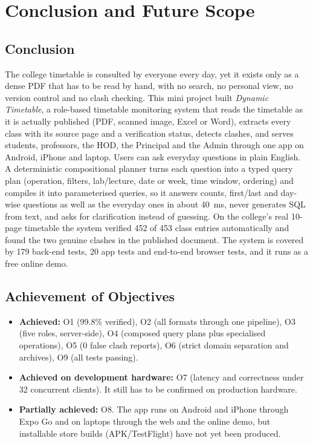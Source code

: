 \section{Conclusion and Future Scope}

\subsection{Conclusion}
The college timetable is consulted by everyone every day, yet it exists only as a dense PDF that has
to be read by hand, with no search, no personal view, no version control and no clash checking. This
mini project built \emph{Dynamic Timetable}, a role-based timetable monitoring system that reads the
timetable as it is actually published (PDF, scanned image, Excel or Word), extracts every class with
its source page and a verification status, detects clashes, and serves students, professors, the HOD,
the Principal and the Admin through one app on Android, iPhone and laptop. Users can ask everyday
questions in plain English. A deterministic compositional planner turns each question into a typed
query plan (operation, filters, lab/lecture, date or week, time window, ordering) and compiles it into
parameterised queries, so it answers counts, first/last and day-wise questions as well as the everyday
ones in about 40~ms, never generates SQL from text, and asks for clarification instead of guessing. On the college's real 10-page timetable the system verified 452 of 453 class entries
automatically and found the two genuine clashes in the published document. The system is covered by
179 back-end tests, 20 app tests and end-to-end browser tests, and it runs as a free online demo.

\subsection{Achievement of Objectives}
\begin{itemize}
\item \textbf{Achieved:} O1 (99.8\% verified), O2 (all formats through one pipeline), O3 (five roles,
      server-side), O4 (composed query plans plus specialised operations), O5 (0 false clash reports), O6 (strict domain separation and
      archives), O9 (all tests passing).
\item \textbf{Achieved on development hardware:} O7 (latency and correctness under 32 concurrent
      clients). It still has to be confirmed on production hardware.
\item \textbf{Partially achieved:} O8. The app runs on Android and iPhone through Expo Go and on
      laptops through the web and the online demo, but installable store builds (APK/TestFlight) have
      not yet been produced.
\end{itemize}

